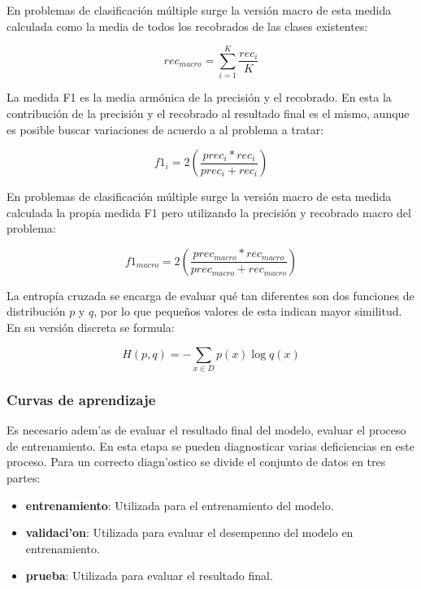 En problemas de clasificación múltiple surge la versión macro de esta medida calculada como la media de todos
los recobrados de las clases existentes:

\begin{equation}
	rec_{macro} = \sum^K_{i=1} \frac{rec_i}{K}
\end{equation}

La medida F1 es la media armónica de la precisión y el recobrado. En esta la contribución de la precisión y el
recobrado al resultado final es el mismo, aunque es posible buscar variaciones de acuerdo a al problema a tratar:

\begin{equation}
	f1_i = 2 (\frac{prec_i * rec_i}{prec_i + rec_i})
\end{equation}

En problemas de clasificación múltiple surge la versión macro de esta medida calculada la propia medida F1 pero
utilizando la precisión y recobrado macro del problema:

\begin{equation}
	f1_{macro} = 2 (\frac{prec_{macro} * rec_{macro}}{prec_{macro} + rec_{macro}})
\end{equation}

La entropía cruzada se encarga de evaluar qué tan diferentes son dos funciones de distribución $p$ y $q$, por lo que
pequeños valores de esta indican mayor similitud. En su versión discreta se formula:

\begin{equation}
	H(p, q) = - \sum_{x \in D} p(x) \log q(x)
\end{equation}

\subsubsection{Curvas de aprendizaje}

Es necesario adem'as de evaluar el resultado final del modelo, evaluar el proceso de entrenamiento. En esta etapa 
se pueden diagnosticar varias deficiencias en este proceso. Para un correcto diagn'ostico se divide el conjunto de 
datos en tres partes:

\begin{itemize}
	\item \textbf{entrenamiento}: Utilizada para el entrenamiento del modelo.
	\item \textbf{validaci'on}: Utilizada para evaluar el desempenno del modelo en entrenamiento.
	\item \textbf{prueba}: Utilizada para evaluar el resultado final.
\end{itemize}

